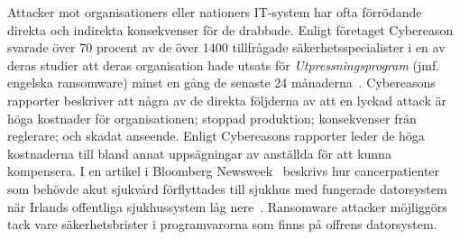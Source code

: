 Attacker mot organisationers eller nationers IT-system har ofta förrödande
direkta och indirekta konsekvenser för de drabbade. Enligt företaget Cybereason
svarade över 70 procent av de över 1400 tillfrågade säkerhetsspecialister i en
av deras studier att deras organisation hade utsats för
\emph{Utpressningsprogram} (jmf. engelska ransomware) minst en gång de senaste
24 månaderna~\cite{cyberreason2021, cyberreason2022}. Cybereasons rapporter
beskriver att några av de direkta följderna av att en lyckad attack är höga
kostnader för organisationen; stoppad produktion; konsekvenser från reglerare;
och skadat anseende. Enligt Cybereasons rapporter leder de höga kostnaderna till
bland annat uppsägningar av anställda för att kunna kompensera. I en artikel i
Bloomberg Newsweek~\cite{gallagher2023} beskrivs hur cancerpatienter som behövde
akut sjukvård förflyttades till sjukhus med fungerade datorsystem när Irlands
offentliga sjukhussystem låg nere~\cite{hse_report}. Ransomware attacker
möjliggörs tack vare säkerhetsbrister i programvarorna som finns på offrens
datorsystem.

